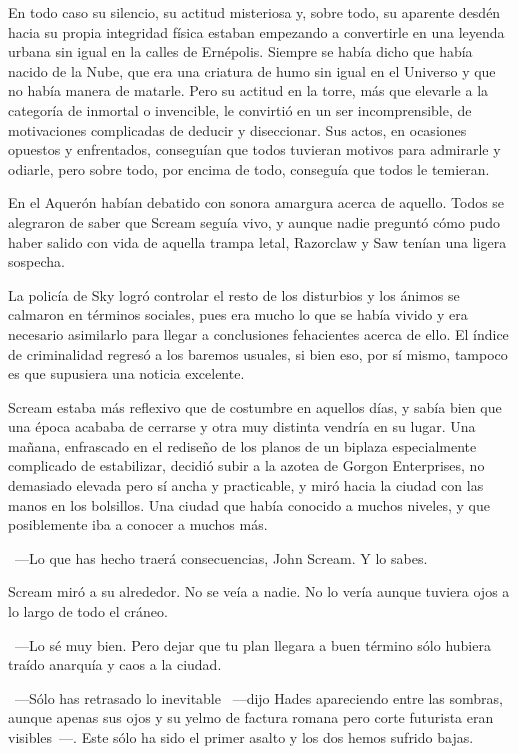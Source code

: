 En todo caso su silencio, su actitud misteriosa y, sobre todo, su aparente desdén hacia su propia integridad física estaban empezando a convertirle en una leyenda urbana sin igual en la calles de Ernépolis. Siempre se había dicho que había nacido de la Nube, que era una criatura de humo sin igual en el Universo y que no había manera de matarle. Pero su actitud en la torre, más que elevarle a la categoría de inmortal o invencible, le convirtió en un ser incomprensible, de motivaciones complicadas de deducir y diseccionar. Sus actos, en ocasiones opuestos y enfrentados, conseguían que todos tuvieran motivos para admirarle y odiarle, pero sobre todo, por encima de todo, conseguía que todos le temieran.

En el Aquerón habían debatido con sonora amargura acerca de aquello. Todos se alegraron de saber que Scream seguía vivo, y aunque nadie preguntó cómo pudo haber salido con vida de aquella trampa letal, Razorclaw y Saw tenían una ligera sospecha.

La policía de Sky logró controlar el resto de los disturbios y los ánimos se calmaron en términos sociales, pues era mucho lo que se había vivido y era necesario asimilarlo para llegar a conclusiones fehacientes acerca de ello. El índice de criminalidad regresó a los baremos usuales, si bien eso, por sí mismo, tampoco es que supusiera una noticia excelente.

Scream estaba más reflexivo que de costumbre en aquellos días, y sabía bien que una época acababa de cerrarse y otra muy distinta vendría en su lugar. Una mañana, enfrascado en el rediseño de los planos de un biplaza especialmente complicado de estabilizar, decidió subir a la azotea de Gorgon Enterprises, no demasiado elevada pero sí ancha y practicable, y miró hacia la ciudad con las manos en los bolsillos. Una ciudad que había conocido a muchos niveles, y que posiblemente iba a conocer a muchos más.

~---Lo que has hecho traerá consecuencias, John Scream. Y lo sabes.

Scream miró a su alrededor. No se veía a nadie. No lo vería aunque tuviera ojos a lo largo de todo el cráneo.

~---Lo sé muy bien. Pero dejar que tu plan llegara a buen término sólo hubiera traído anarquía y caos a la ciudad.

~---Sólo has retrasado lo inevitable ~---dijo Hades apareciendo entre las sombras, aunque apenas sus ojos y su yelmo de factura romana pero corte futurista eran visibles~---. Este sólo ha sido el primer asalto y los dos hemos sufrido bajas.

